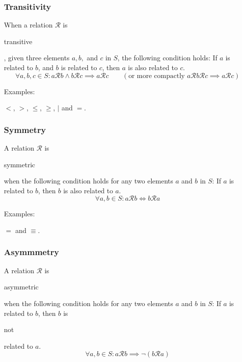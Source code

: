 \documentclass[11pt]{article}
\theoremstyle{plain}
\theoremstyle{definition}
\begin{document}
\subsubsection*{ Transitivity}

When a relation $ \mathcal{R} $ is \begin{em}transitive\end{em}, given three elements $ a, b, $ and $ c $ in $ S $, the following condition holds: If $ a $ is related to $ b $, and $ b $ is related to $ c $, then $ a $ is also related to $ c $. 
\begin{displaymath}
  \forall a, b, c \in S : a\mathcal{R}b \wedge b\mathcal{R}c \implies a\mathcal{R}c  \quad \quad (\text{or more compactly } a\mathcal{R}b\mathcal{R}c \implies a\mathcal{R}c)
\end{displaymath}

\noindent \begin{em}Examples:\end{em} $ < $, $ > $, $ \le $, $ \ge $, $ | $ and $ = $.

\subsubsection*{ Symmetry}

A relation $ \mathcal{R} $ is \begin{em}symmetric\end{em} when the following condition holds for any two elements $ a $ and $ b $ in $ S $: If $ a $ is related to $ b $, then $ b $ is also related to $ a $. 
\begin{displaymath}
	\forall a, b \in S : a\mathcal{R}b \iff b\mathcal{R}a 
\end{displaymath}

\noindent \begin{em}Examples:\end{em} $ = $ and $ \equiv $.

\subsubsection*{ Asymmmetry}

A relation $ \mathcal{R} $ is \begin{em}asymmetric\end{em} when the following condition holds for any two elements $ a $ and $ b $ in $ S $: If $ a $ is related to $ b $, then $ b $ is \begin{em}not\end{em} related to $ a $. 
\begin{displaymath}
  \forall a, b \in S : a\mathcal{R}b \implies \neg(b\mathcal{R}a)
\end{displaymath}
\end{document}
